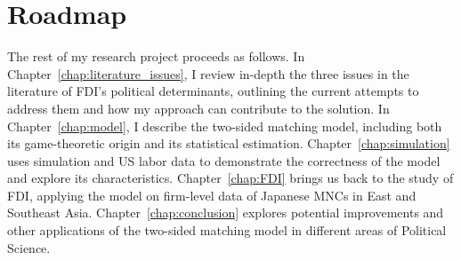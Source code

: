 \section{Roadmap}

The rest of my research project proceeds as follows. In
Chapter~\ref{chap:literature_issues}, I review in-depth the three issues in the
literature of FDI's political determinants, outlining the current attempts to
address them and how my approach can contribute to the solution. In
Chapter~\ref{chap:model}, I describe the two-sided matching model, including
both its game-theoretic origin and its statistical estimation.
Chapter~\ref{chap:simulation} uses simulation and US labor data to demonstrate
the correctness of the model and explore its characteristics.
Chapter~\ref{chap:FDI} brings us back to the study of FDI, applying the model on
firm-level data of Japanese MNCs in East and Southeast Asia.
Chapter~\ref{chap:conclusion} explores potential improvements and other
applications of the two-sided matching model in different areas of Political
Science.

